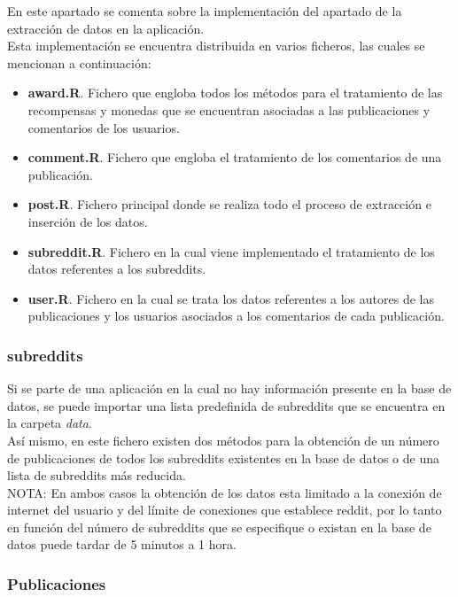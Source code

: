 \documentclass[../../main.tex]{subfiles}
\begin{document}
En este apartado se comenta sobre la implementación del apartado de la extracción de datos en la aplicación.  \\

Esta implementación se encuentra distribuida en varios ficheros, las cuales se mencionan a continuación:

\begin{itemize}
    \item \textbf{award.R}. Fichero que engloba todos los métodos para el tratamiento de las recompensas y monedas que se encuentran asociadas a las publicaciones y comentarios de los usuarios.
    \item \textbf{comment.R}. Fichero que engloba el tratamiento de los comentarios de una publicación.
    \item \textbf{post.R}. Fichero principal donde se realiza todo el proceso de extracción e inserción de los datos.
    \item \textbf{subreddit.R}. Fichero en la cual viene implementado el tratamiento de los datos referentes a los \glspl{subreddit}.
    \item \textbf{user.R}. Fichero en la cual se trata los datos referentes a los autores de las publicaciones y los usuarios asociados a los comentarios de cada publicación.
\end{itemize}

\subsubsection{\Glspl{subreddit}}

Si se parte de una aplicación en la cual no hay información presente en la base de datos, se puede importar una lista predefinida de \glspl{subreddit} que se encuentra en la carpeta \textit{data}.  \\

Así mismo, en este fichero existen dos métodos para la obtención de un número de publicaciones de todos los \glspl{subreddit} existentes en la base de datos o de una lista de \glspl{subreddit} más reducida.  \\

NOTA: En ambos casos la obtención de los datos esta limitado a la conexión de internet del usuario y del límite de conexiones que establece \Gls{reddit}, por lo tanto en función del número de \glspl{subreddit} que se especifique o existan en la base de datos puede tardar de 5 minutos a 1 hora.

\subsubsection{Publicaciones}
\end{document}
